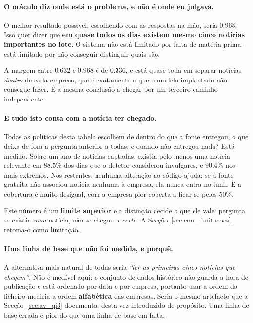 \paragraph{O oráculo diz onde está o problema, e não é onde eu julgava.}
O melhor resultado possível, escolhendo com as respostas na mão, seria $0.968$. Isso quer dizer
que \textbf{em quase todos os dias existem mesmo cinco notícias importantes no lote}. O sistema não
está limitado por falta de matéria-prima: está limitado por não conseguir distinguir quais são.

A margem entre $0.632$ e $0.968$ é de $0.336$, e está quase toda em separar notícias \emph{dentro}
de cada empresa, que é exatamente o que o modelo implantado não consegue fazer. É a mesma
conclusão a chegar por um terceiro caminho independente.

\paragraph{E tudo isto conta com a notícia ter chegado.}
Todas as políticas desta tabela escolhem de dentro do que a fonte entregou, o que deixa de fora a
pergunta anterior a todas: e quando não entregou nada? Está medido. Sobre um ano de notícias
captadas, existia pelo menos uma notícia relevante em $88.5\%$ dos dias que o detetor considerou
invulgares, e $90.4\%$ nos mais extremos. Nos restantes, nenhuma alteração ao código ajuda: se a
fonte gratuita não associou notícia nenhuma à empresa, ela nunca entra no funil. E a cobertura é
muito desigual, com a empresa pior coberta a ficar-se pelos $50\%$.

Este número é um \textbf{limite superior} e a distinção decide o que ele vale: pergunta se existia
\emph{uma} notícia, não se chegou \emph{a certa}. A Secção~\ref{sec:con_limitacoes} retoma-o como
limitação.

\paragraph{Uma linha de base que não foi medida, e porquê.}
A alternativa mais natural de todas seria \emph{``ler as primeiras cinco notícias que chegam''}.
Não é medível aqui: o conjunto de dados histórico não guarda a hora de publicação e está ordenado
por data e por empresa, portanto usar a ordem do ficheiro mediria a ordem \textbf{alfabética} das
empresas. Seria o mesmo artefacto que a Secção~\ref{sec:av_qi3} documenta, desta vez introduzido de
propósito. Uma linha de base errada é pior do que uma linha de base em falta.

